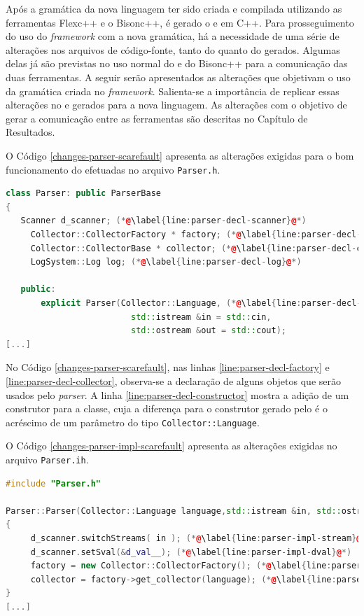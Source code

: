 Após a gramática da nova linguagem ter sido criada e compilada utilizando as ferramentas \textsf{Flexc++} e o \textsf{Bisonc++}, é gerado o \parser e \scanner em C++. Para prosseguimento do uso do \textit{framework} com a nova gramática, há a necessidade de
uma série de alterações nos arquivos de código-fonte, tanto do \parser quanto do
\scanner gerados. Algumas delas já são previstas no uso normal do \flexcpp e do
\textsf{Bisonc++} para a comunicação das duas ferramentas. A seguir serão apresentados as alterações que objetivam o uso da gramática criada no \textit{framework}. Salienta-se a importância de replicar essas alterações no \parser e \scanner gerados para a nova linguagem. As alterações com o
objetivo de gerar a comunicação entre as ferramentas são descritas no Capítulo de
Resultados.  

O Código \ref{changes-parser-scarefault} apresenta as alterações exigidas para
o bom funcionamento do \scarefault efetuadas no arquivo \lstinline|Parser.h|. 

\begin{lstlisting}[language=C++, label=changes-parser-scarefault, caption=Alterações no \lstinline|Parser.h| para uso do \scarefault]
class Parser: public ParserBase
{
   Scanner d_scanner; (*@\label{line:parser-decl-scanner}@*)
	 Collector::CollectorFactory * factory; (*@\label{line:parser-decl-factory}@*)
	 Collector::CollectorBase * collector; (*@\label{line:parser-decl-collector}@*)
	 LogSystem::Log log; (*@\label{line:parser-decl-log}@*)
        
   public:
	   explicit Parser(Collector::Language, (*@\label{line:parser-decl-constructor}@*)
		                 std::istream &in = std::cin,
		                 std::ostream &out = std::cout);
[...]
\end{lstlisting}

No Código \ref{changes-parser-scarefault}, nas linhas
\ref{line:parser-decl-factory} e \ref{line:parser-decl-collector}, observa-se
a declaração de alguns objetos que serão usados pelo \textit{parser}. A linha
\ref{line:parser-decl-constructor} mostra a adição de um construtor para a
classe, cuja a diferença para o construtor gerado pelo \bisoncpp é o acréscimo
de um parâmetro do tipo \lstinline|Collector::Language|.

O Código \ref{changes-parser-impl-scarefault} apresenta as alterações exigidas
no arquivo \lstinline|Parser.ih|.

\begin{lstlisting}[language=C++, label=changes-parser-impl-scarefault, caption=Alterações no \lstinline|Parser.ih| para uso do \scarefault]
#include "Parser.h"

Parser::Parser(Collector::Language language,std::istream &in, std::ostream &out) (*@\label{line:parser-impl-constructor}@*)
{
	 d_scanner.switchStreams( in ); (*@\label{line:parser-impl-stream}@*)
	 d_scanner.setSval(&d_val__); (*@\label{line:parser-impl-dval}@*)
	 factory = new Collector::CollectorFactory(); (*@\label{line:parser-impl-factory}@*)
	 collector = factory->get_collector(language); (*@\label{line:parser-impl-collector}@*)
}
[...]
\end{lstlisting}


